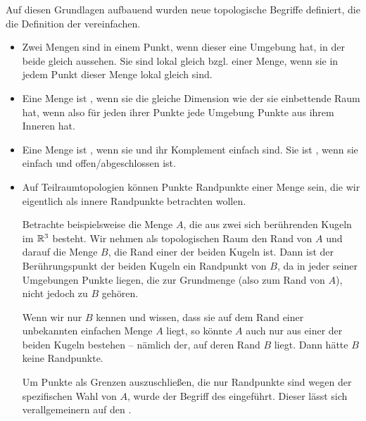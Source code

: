     Auf diesen Grundlagen aufbauend wurden neue topologische Begriffe definiert, die die Definition der \strukt vereinfachen.
    \begin{itemize}
        \item 
            Zwei Mengen sind  in einem Punkt, wenn dieser eine Umgebung hat, in der beide gleich aussehen.
            Sie sind lokal gleich bzgl. einer Menge, wenn sie in jedem Punkt dieser Menge lokal gleich sind.
        
        \item
            Eine Menge ist , wenn sie die gleiche Dimension wie der sie einbettende Raum hat, wenn also für jeden ihrer Punkte jede Umgebung Punkte aus ihrem Inneren hat.
        
        \item
            Eine Menge ist , wenn sie und ihr Komplement einfach sind.
            Sie ist , wenn sie einfach und offen/abgeschlossen ist.
        
        \item
            Auf Teilraumtopologien können Punkte Randpunkte einer Menge sein, die wir eigentlich als innere Randpunkte betrachten wollen.
            
            Betrachte beispielsweise die Menge $A$, die aus zwei sich berührenden Kugeln im $\mathbb{R}^3$ besteht.
            Wir nehmen als topologischen Raum den Rand von $A$ und darauf die Menge $B$, die Rand einer der beiden Kugeln ist. 
            Dann ist der Berührungspunkt der beiden Kugeln ein Randpunkt von $B$, da in jeder seiner Umgebungen Punkte liegen, die zur Grundmenge (also zum Rand von $A$), nicht jedoch zu $B$ gehören.
            
            Wenn wir nur $B$ kennen und wissen, dass sie auf dem Rand einer unbekannten einfachen Menge $A$ liegt, so könnte $A$ auch nur aus einer der beiden Kugeln bestehen -- nämlich der, auf deren Rand $B$ liegt.
            Dann hätte $B$ keine Randpunkte.
            
            Um Punkte als Grenzen auszuschließen, die nur Randpunkte sind wegen der spezifischen Wahl von $A$,  wurde der Begriff des  eingeführt.
            Dieser lässt sich verallgemeinern auf den .
    \end{itemize}
%
%
